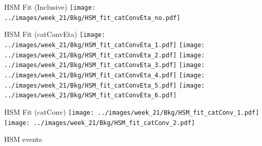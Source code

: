 \documentclass[10pt,UKenglish, leqno, xcolor = dvipsnames]{beamer}
\begin{document}
		\begin{frame}{HSM Fit (Inclusive)}
			\vfill
			\centering
			\texttt{[image: ../images/week\_21/Bkg/HSM\_fit\_catConvEta\_no.pdf]}
			\vfill
		\end{frame}
	
		\begin{frame}{HSM Fit (catConvEta)}
			\vfill
			\centering
			\texttt{[image: ../images/week\_21/Bkg/HSM\_fit\_catConvEta\_1.pdf]}
			\texttt{[image: ../images/week\_21/Bkg/HSM\_fit\_catConvEta\_2.pdf]}
			\texttt{[image: ../images/week\_21/Bkg/HSM\_fit\_catConvEta\_3.pdf]}
			\texttt{[image: ../images/week\_21/Bkg/HSM\_fit\_catConvEta\_4.pdf]}
			\texttt{[image: ../images/week\_21/Bkg/HSM\_fit\_catConvEta\_5.pdf]}
			\texttt{[image: ../images/week\_21/Bkg/HSM\_fit\_catConvEta\_6.pdf]}
			\vfill
		\end{frame}
	
		\begin{frame}{HSM Fit (catConv)}
			\vfill
			\centering
			\texttt{[image: ../images/week\_21/Bkg/HSM\_fit\_catConv\_1.pdf]}
			\texttt{[image: ../images/week\_21/Bkg/HSM\_fit\_catConv\_2.pdf]}
			\vfill
		\end{frame}
	
		\begin{frame}{HSM events}
			\vfill
			\centering
			\begin{table}[tbp]
				\centering
				\caption{\centering Number of HSM events for each category}
			\end{table}
			\vfill
		\end{frame}
	
\end{document}
